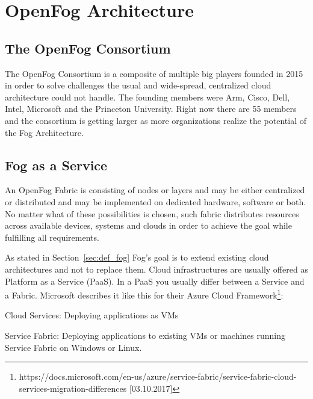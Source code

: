 \section{OpenFog Architecture}

\subsection{The OpenFog Consortium}

The OpenFog Consortium is a composite of multiple big players founded in 2015 in order to solve challenges the usual and wide-spread, centralized cloud architecture could not handle.
The founding members were Arm, Cisco, Dell, Intel, Microsoft and the Princeton University. Right now there are 55 members and the consortium is getting larger as more organizations realize the potential of the Fog Architecture.

\subsection{Fog as a Service}


An OpenFog Fabric is consisting of nodes or layers and may be either centralized or distributed and may be implemented on dedicated hardware, software or both. No matter what of these possibilities is chosen, such fabric distributes resources across available devices, systems and clouds in order to achieve the goal while fulfilling all requirements.\cite[p. 7]{OpenFog}

As stated in Section~\ref{sec:def_fog} Fog's goal is to extend existing cloud architectures and not to replace them. Cloud infrastructures are usually offered as Platform as a Service (PaaS).
In a PaaS you usually differ between a Service and a Fabric.
Microsoft describes it like this for their Azure Cloud Framework\footnote{https://docs.microsoft.com/en-us/azure/service-fabric/service-fabric-cloud-services-migration-differences [03.10.2017]}:

Cloud Services: Deploying applications as VMs 

Service Fabric: Deploying applications to existing VMs or machines running Service Fabric on Windows or Linux.